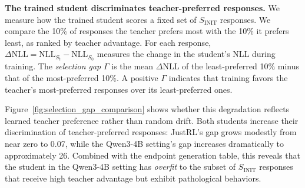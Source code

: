 \textbf{The trained student discriminates teacher-preferred responses.}
We measure how the trained student scores a fixed set of $S_{\mathrm{INIT}}$ responses.
We compare the 10\% of responses the teacher prefers most with the 10\% it prefers least, as ranked by teacher advantage.
For each response, $\Delta\text{NLL} = \text{NLL}_{S_t} - \text{NLL}_{S_0}$ measures the change in the student's NLL during training.
The \textit{selection gap} $\Gamma$ is the mean $\Delta\text{NLL}$ of the least-preferred 10\% minus that of the most-preferred 10\%.
A positive $\Gamma$ indicates that training favors the teacher's most-preferred responses over its least-preferred ones.

Figure~\ref{fig:selection_gap_comparison} shows whether this degradation reflects learned teacher preference rather than random drift. Both students increase their discrimination of teacher-preferred responses: JustRL's gap grows modestly from near zero to 0.07, while the Qwen3-4B setting's gap increases dramatically to approximately 26.
Combined with the endpoint generation table, this reveals that the student in the Qwen3-4B setting has \textit{overfit} to the subset of $S_{\mathrm{INIT}}$ responses that receive high teacher advantage but exhibit pathological behaviors.

